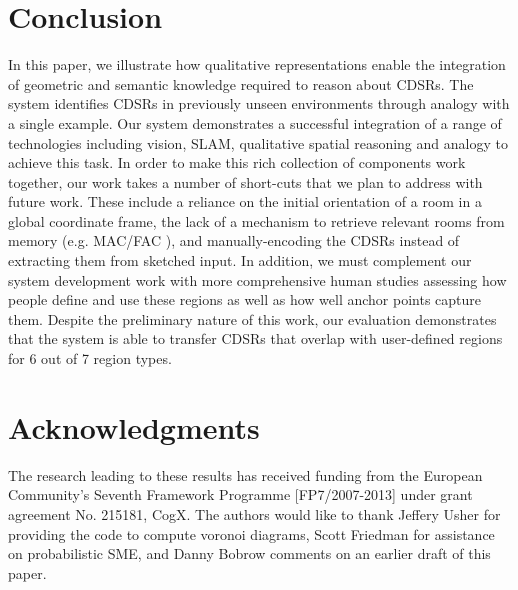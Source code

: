 \documentclass[letterpaper]{article}
\begin{document}

\section{Conclusion}

In this paper, we illustrate how qualitative representations enable the integration of geometric and semantic knowledge required to reason about CDSRs. The system identifies CDSRs in previously unseen environments through analogy with a single example. Our system demonstrates a successful integration of a range of technologies including vision, SLAM, qualitative spatial reasoning and analogy to achieve this task. In order to make this rich collection of components work together, our work takes a number of short-cuts that we plan to address with future work. These include a reliance on the initial orientation of a room in a global coordinate frame, the lack of a mechanism to retrieve relevant rooms from memory (e.g. MAC/FAC \cite{forbus/etal1995}), and manually-encoding the CDSRs instead of extracting them from sketched input. In addition, we must complement our system development work with more comprehensive human studies assessing how people define and use these regions as well as how well anchor points capture them. Despite the preliminary nature of this work, our evaluation demonstrates that the system is able to transfer CDSRs that overlap with user-defined regions for 6 out of 7 region types.


\section{Acknowledgments}
 
The research leading to these results has received funding from the European Community's Seventh Framework Programme [FP7/2007-2013] under grant agreement No. 215181, CogX. The authors would like to thank Jeffery Usher for providing the code to compute voronoi diagrams, Scott Friedman for assistance on probabilistic SME, and Danny Bobrow comments on an earlier draft of this paper.




\end{document}
